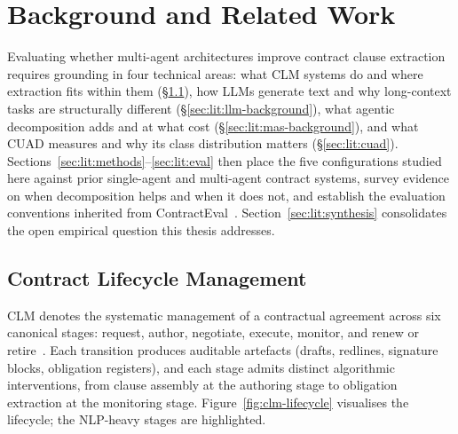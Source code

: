
\chapter{Background and Related Work}\label{chapter:literature-review}

Evaluating whether multi-agent architectures improve contract clause extraction
requires grounding in four technical areas: what CLM systems do and where
extraction fits within them (\S\ref{sec:lit:clm}), how LLMs generate text and
why long-context tasks are structurally different (\S\ref{sec:lit:llm-background}), what
agentic decomposition adds and at what cost (\S\ref{sec:lit:mas-background}),
and what CUAD measures and why its class distribution matters
(\S\ref{sec:lit:cuad}). Sections~\ref{sec:lit:methods}--\ref{sec:lit:eval}
then place the five configurations studied here against prior single-agent and
multi-agent contract systems, survey evidence on when decomposition helps and
when it does not, and establish the evaluation conventions inherited from
ContractEval~\cite{liu2025contracteval}.
Section~\ref{sec:lit:synthesis} consolidates the open empirical question this
thesis addresses.

\section{Contract Lifecycle Management}\label{sec:lit:clm}

CLM denotes the systematic management of a contractual agreement across six
canonical stages: request, author, negotiate, execute, monitor, and renew or
retire~\cite{worldcc2025benchmark}.
Each transition produces auditable artefacts (drafts, redlines, signature blocks,
obligation registers), and each stage admits distinct algorithmic interventions,
from clause assembly at the authoring stage to obligation extraction at the
monitoring stage. Figure~\ref{fig:clm-lifecycle} visualises the lifecycle;
the NLP-heavy stages are highlighted.

